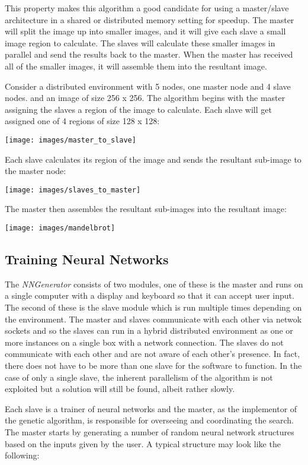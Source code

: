 This property makes this algorithm a good candidate for using a master/slave architecture in a shared or distributed memory setting for speedup. 
The master will split the image up into smaller images, and it will give each slave a small image region to calculate. 
The slaves will calculate these smaller images in parallel and send the results back to the master. 
When the master has received all of the smaller images, it will assemble them into the resultant image.

Consider a distributed environment with 5 nodes, one master node and 4 slave nodes. and an image of size 256 x 256. 
The algorithm begins with the master assigning the slaves a region of the image to calculate. 
Each slave will get assigned one of 4 regions of size 128 x 128:

\texttt{[image: images/master\_to\_slave]}

\newpage
Each slave calculates its region of the image and sends the resultant sub-image to the master node:

\texttt{[image: images/slaves\_to\_master]}
\newpage

The master then assembles the resultant sub-images into the resultant image: 

\texttt{[image: images/mandelbrot]}

\subsection{Training Neural Networks}
The {\em NNGenerator} consists of two modules, one of these is the master and runs on a single computer with a display and keyboard so that it can accept user input.
The second of these is the slave module which is run multiple times depending on the environment.
The master and slaves communicate with each other via netwok sockets and so the slaves can run in a hybrid distributed environment as one or more instances on a single box with a network connection.
The slaves do not communicate with each other and are not aware of each other's presence.
In fact, there does not have to be more than one slave for the software to function.
In the case of only a single slave, the inherent parallelism of the algorithm is not exploited but a solution will still be found, albeit rather slowly.

Each slave is a trainer of neural networks and the master, as the implementor of the genetic algorithm, is responsible for overseeing and coordinating the search.
The master starts by generating a number of random neural network structures based on the inputs given by the user.
A typical structure may look like the following:

